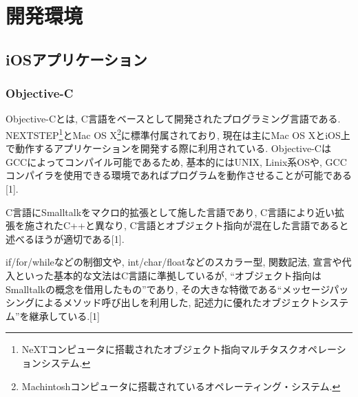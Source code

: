 \chapter{開発環境}
\label{chap:concept}

\section{iOSアプリケーション}
\subsection{Objective-C}
Objective-Cとは, C言語をベースとして開発されたプログラミング言語である.
NEXTSTEP\footnote{NeXTコンピュータに搭載されたオブジェクト指向マルチタスクオペレーションシステム.}とMac OS X\footnote{Machintoshコンピュータに搭載されているオペレーティング・システム.}に標準付属されており, 現在は主にMac OS XとiOS上で動作するアプリケーションを開発する際に利用されている.
Objective-CはGCCによってコンパイル可能であるため, 基本的にはUNIX, Linix系OSや, GCCコンパイラを使用できる環境であればプログラムを動作させることが可能である[1].

C言語にSmalltalkをマクロ的拡張として施した言語であり, C言語により近い拡張を施されたC++と異なり, C言語とオブジェクト指向が混在した言語であると述べるほうが適切である[1].

if/for/whileなどの制御文や, int/char/floatなどのスカラー型, 関数記法, 宣言や代入といった基本的な文法はC言語に準拠しているが, “オブジェクト指向はSmalltalkの概念を借用したもの”であり, その大きな特徴である“メッセージパッシングによるメソッド呼び出しを利用した, 記述力に優れたオブジェクトシステム”を継承している.[1]

